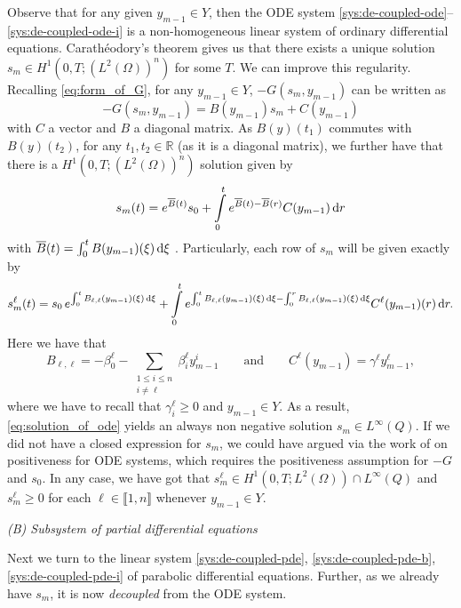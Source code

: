 \documentclass[11pt]{article}
\newcommand{\R}{\mathbb{R}}
\newcommand{\llb}{\llbracket}
\newcommand{\rrb}{\rrbracket}
\numberwithin{equation}{section}
\begin{document}
Observe that for any given \(y_{m-1} \in Y \), then the ODE system \eqref{sys:de-coupled-ode}--\eqref{sys:de-coupled-ode-i} is a non-homogeneous linear system of ordinary differential equations.
%
Carathéodory's theorem gives us that there exists a unique solution \(s_m \in H^{1} ( 0,T;(L^2(\Omega))^{n}  )\) for some \(T\).
	We can improve this regularity. Recalling \eqref{eq:form_of_G}, for any \(y_{m-1} \in Y\), \(-G(s_m,y_{m-1})\) can be written as
	\[
		-G(s_m,y_{m-1}) = B(y_{m-1})s_m + C(y_{m-1})
	\]
	with \(C\) a vector and \(B\) a diagonal matrix. As \(B(y)(t_1)\) commutes with \( B(y)(t_2)\), for any \(t_1, t_2 \in \R\) (as it is a diagonal matrix), we further have that there is a \(H^1 (0,T;(L^2(\Omega))^n )\) solution given by
	\[
		s_m(t) = e^{\overline{B}(t)} s_0 + \int\limits_0^t e^{\overline{B}(t)- \overline{B}(r)} C(y_{m-1}) \dif r
	\]
	with \( \overline{B}(t) = \int_0^t B(y_{m-1})(\xi) \dif \xi\) \cite{Schaeffer-2016}. 
	Particularly, each row of \(s_m\) will be given exactly by
	\begin{equation}
	\label{eq:solution_of_ode}
		s_m^\ell (t) = s_0 \, e^{ \int_0^t B_{\ell,\ell} (y_{m-1})(\xi) \dif \xi } + \int\limits_0^t 
		e^{ \int_0^t B_{\ell,\ell} (y_{m-1})(\xi) \dif \xi - \int_0^r  B_{\ell,\ell} (y_{m-1})(\xi) \dif \xi} 
		C^{\ell} (y_{m-1})(r) \dif r.
	\end{equation}
	Here we have that
	\[
		B_{\ell,\ell} = -\beta_0^\ell - \sum_{\substack{1\le i\le n\\ i\neq \ell}} \beta_i^\ell y_{m-1}^i 
		\qquad\text{and}\qquad
		C^\ell (y_{m-1}) = \gamma^\ell y_{m-1}^\ell,
	\]
	where we have to recall that \( \gamma_i^\ell \geq 0\) and \( y_{m-1} \in Y\). As a result, \eqref{eq:solution_of_ode} yields an always non negative solution \( s_m \in L^\infty (Q)\).
	If we did not have a closed expression for \(s_m\), we could have argued via the work of \cite{Horvath-1998} on positiveness for ODE systems, which requires the positiveness assumption for \(-G\) and \(s_0\). In any case, we have got that \( s_m^\ell \in H^1(0,T;L^2(\Omega) ) \cap L^\infty (Q)\) and \(s_m^\ell \geq 0\) for each \(\ell\in \llb 1,n\rrb\) whenever \(y_{m-1} \in Y\).



\vspace{1\baselineskip}
\noindent\emph{(B) Subsystem of partial differential equations}
\vspace{0.5\baselineskip}


Next we turn to the linear system \eqref{sys:de-coupled-pde}, \eqref{sys:de-coupled-pde-b}, \eqref{sys:de-coupled-pde-i} of parabolic differential equations. Further, as we already have \(s_m\), it is now \emph{decoupled} from the ODE system. 
\end{document}
